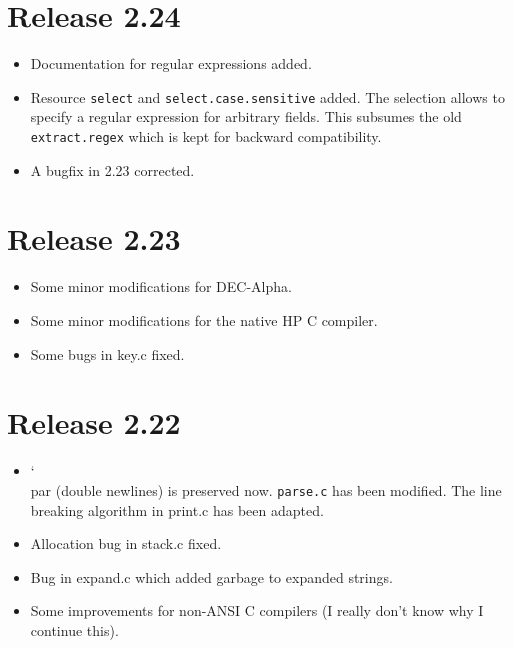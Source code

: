 \documentclass[11pt,a4paper]{scrartcl}
\newcommand\rsc[1]{\texttt{#1}}
\newcommand\File[1]{\textsf{#1}}
\newenvironment{Release}[2]{\section*{Release #1}\begin{itemize}}{\end{itemize}}
\newenvironment{Fix}[1]{\item }{}
\newenvironment{New}[1]{\item }{}
\newenvironment{Doc}[1]{\item }{}
\newenvironment{Update}[1]{\item }{}
\newcommand\BS{\char`\\}
\begin{document}
 \begin{Release}{2.24}{}
  \begin{Doc}{gene}
    Documentation for regular expressions added.
  \end{Doc}
  \begin{New}{gene}
    Resource \rsc{select} and
    \rsc{select.case.sensitive} added. The selection allows to
    specify a regular expression for arbitrary fields. This subsumes
    the old \rsc{extract.regex} which is kept for backward
    compatibility.
  \end{New}
  \begin{Fix}{gene}
    A bugfix in 2.23 corrected.
  \end{Fix}
 \end{Release}

 \begin{Release}{2.23}{}
  \begin{Update}{gene}
    Some minor modifications for DEC-Alpha.
  \end{Update}
  \begin{Update}{gene}
    Some minor modifications for the native HP C compiler.
  \end{Update}
  \begin{Fix}{gene}
    Some bugs in \File{key.c} fixed.
  \end{Fix}
 \end{Release}

 \begin{Release}{2.22}{}
  \begin{Update}{gene}
    \BS par (double newlines) is preserved now. \rsc{parse.c}
    has been modified. The line breaking algorithm in \File{print.c}
    has been adapted.
  \end{Update}
  \begin{Fix}{gene}
    Allocation bug in \File{stack.c} fixed.
  \end{Fix}
  \begin{Fix}{gene}
    Bug in \File{expand.c} which added garbage to expanded strings.
  \end{Fix}
  \begin{Update}{gene}
    Some improvements for non-ANSI C compilers (I really don't know
    why I continue this).
  \end{Update}
 \end{Release}
\end{document}
